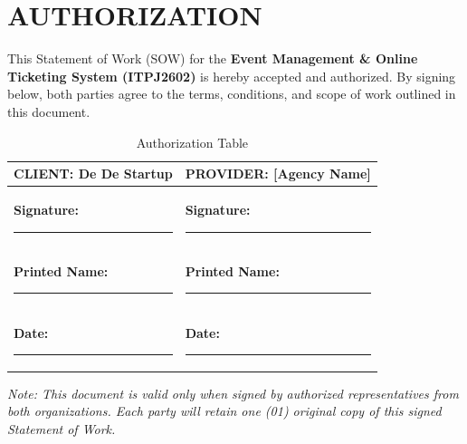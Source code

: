 \chapter{AUTHORIZATION}

This Statement of Work (SOW) for the \textbf{Event Management \& Online Ticketing System (ITPJ2602)} is hereby accepted and authorized. By signing below, both parties agree to the terms, conditions, and scope of work outlined in this document.

\vspace{1.5cm}

\begin{table}[h!]
\centering
\renewcommand{\arraystretch}{3.5} %
\begin{tabular}{|p{}|p{}|}
\hline
\rowcolor[HTML]{EFEFEF} 
\textbf{CLIENT: De De Startup} & \textbf{PROVIDER: [Agency Name]} \\ \hline

\textbf{Signature:} \newline 
\rule{6cm}{0.4pt} & 
\textbf{Signature:} \newline 
\rule{6cm}{0.4pt} \\ \hline

\textbf{Printed Name:} \newline 
\rule{6cm}{0.4pt} & 
\textbf{Printed Name:} \newline 
\rule{6cm}{0.4pt} \\ \hline

\textbf{Date:} \newline 
\rule{6cm}{0.4pt} & 
\textbf{Date:} \newline 
\rule{6cm}{0.4pt} \\ \hline

\end{tabular}
\caption{Authorization Table}
\end{table}

\vspace{1cm}
\textit{Note: This document is valid only when signed by authorized representatives from both organizations. Each party will retain one (01) original copy of this signed Statement of Work.}
